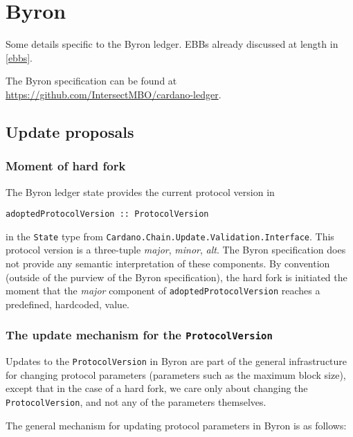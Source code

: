\chapter{Byron}

Some details specific to the Byron ledger.
EBBs already discussed at length in \cref{ebbs}.

The Byron specification can be found at \url{https://github.com/IntersectMBO/cardano-ledger}.

\section{Update proposals}
\label{byron:hardfork}

\subsection{Moment of hard fork}
\label{byron:hardfork:moment}

The Byron ledger state provides the current protocol version in
%
\begin{lstlisting}
adoptedProtocolVersion :: ProtocolVersion
\end{lstlisting}
%
in the \lstinline!State! type from
\lstinline!Cardano.Chain.Update.Validation.Interface!.
This protocol version is a three-tuple \emph{major}, \emph{minor}, \emph{alt}.
The Byron specification does not provide any semantic interpretation of these
components. By convention (outside of the purview of the Byron specification),
the hard fork is initiated the moment that the \emph{major} component of
\lstinline!adoptedProtocolVersion! reaches a predefined, hardcoded, value.

\subsection{The update mechanism for the \lstinline!ProtocolVersion!}

Updates to the \lstinline!ProtocolVersion! in Byron are part of the general
infrastructure for changing protocol parameters (parameters such as the maximum
block size), except that in the case of a hard fork, we care only about changing
the \lstinline!ProtocolVersion!, and not any of the parameters themselves.

The general mechanism for updating protocol parameters in Byron is as follows:

